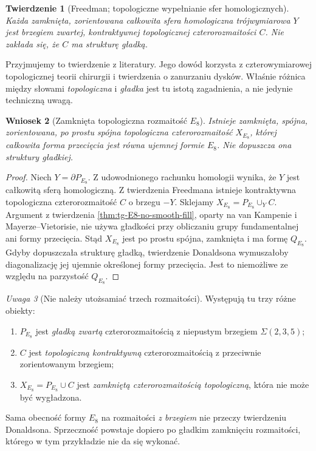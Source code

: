 \documentclass[11pt,a4paper]{report}
\numberwithin{equation}{section}
\theoremstyle{plain}
\newtheorem{twierdzenie}{Twierdzenie}[section]
\newtheorem{wniosek}[twierdzenie]{Wniosek}
\theoremstyle{definition}
\theoremstyle{remark}
\newtheorem{uwaga}[twierdzenie]{Uwaga}
\begin{document}
\begin{twierdzenie}[Freedman; topologiczne wypełnianie sfer homologicznych]
Każda zamknięta, zorientowana całkowita sfera homologiczna
trójwymiarowa $Y$ jest brzegiem zwartej,
kontraktywnej \emph{topologicznej} czterorozmaitości $C$.
Nie zakłada się, że $C$ ma strukturę gładką.
\end{twierdzenie}

Przyjmujemy to twierdzenie z literatury. Jego dowód
korzysta z czterowymiarowej topologicznej teorii chirurgii
i twierdzenia o zanurzaniu dysków. Właśnie różnica między
słowami \emph{topologiczna} i \emph{gładka} jest tu istotą
zagadnienia, a nie jedynie techniczną uwagą.

\begin{wniosek}[Zamknięta topologiczna rozmaitość $E_8$]
Istnieje zamknięta, spójna, zorientowana, po prostu
spójna topologiczna czterorozmaitość $X_{E_8}$,
której całkowita forma przecięcia jest równa
ujemnej formie $E_8$. Nie dopuszcza ona struktury gładkiej.
\end{wniosek}
\begin{proof}
Niech $Y=\partial P_{E_8}$. Z udowodnionego rachunku
homologii wynika, że $Y$ jest całkowitą sferą homologiczną.
Z twierdzenia Freedmana istnieje kontraktywna topologiczna
czterorozmaitość $C$ o brzegu $-Y$. Sklejamy
$X_{E_8}=P_{E_8}\cup_Y C$. Argument z twierdzenia
\ref{thm:tg-E8-no-smooth-fill}, oparty na van Kampenie
i Mayerze--Vietorisie, nie używa gładkości przy
obliczaniu grupy fundamentalnej ani formy przecięcia.
Stąd $X_{E_8}$ jest po prostu spójna, zamknięta
i ma formę $Q_{E_8}$. Gdyby dopuszczała strukturę gładką,
twierdzenie Donaldsona wymuszałoby diagonalizację
jej ujemnie określonej formy przecięcia. Jest to
niemożliwe ze względu na parzystość $Q_{E_8}$.
\end{proof}

\begin{uwaga}[Nie należy utożsamiać trzech rozmaitości]
Występują tu trzy różne obiekty:
\begin{enumerate}[label=(\roman*)]
\item $P_{E_8}$ jest \emph{gładką zwartą} czterorozmaitością
z niepustym brzegiem $\Sigma(2,3,5)$;
\item $C$ jest \emph{topologiczną kontraktywną}
czterorozmaitością z przeciwnie zorientowanym brzegiem;
\item $X_{E_8}=P_{E_8}\cup C$ jest \emph{zamkniętą
czterorozmaitością topologiczną}, która nie może być wygładzona.
\end{enumerate}
Sama obecność formy $E_8$ na rozmaitości \emph{z brzegiem}
nie przeczy twierdzeniu Donaldsona. Sprzeczność powstaje
dopiero po gładkim zamknięciu rozmaitości, którego
w tym przykładzie nie da się wykonać.
\end{uwaga}
\end{document}
